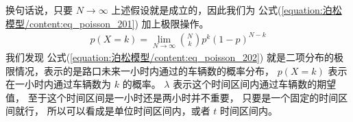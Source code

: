 \documentclass[letterpaper,10pt,english]{sphinxmanual}
\begin{document}
换句话说，只要 \(N \to \infty\)
上述假设就是成立的，因此我们为 公式(\ref{equation:泊松模型/content:eq_poisson_201})
加上极限操作。
\begin{equation}\label{equation:泊松模型/content:eq_poisson_202}
\begin{split}p(X=k) = \lim_{N \to \infty} \binom{N}{k} p^k \left ( 1-p  \right )^{N-k}\end{split}
\end{equation}
我们发现 公式(\ref{equation:泊松模型/content:eq_poisson_202}) 就是二项分布的极限情况，表示的是路口未来一小时内通过的车辆数的概率分布，
\(p(X=k)\) 表示在一小时内通过车辆数为 \(k\)
的概率。
\(\lambda\) 表示这个时间区间内通过车辆数的期望值，
至于这个时间区间是一小时还是两小时并不重要，
只要是一个固定的时间区间就行，
所以可以看成是单位时间区间内，或者 \(t\) 时间区间内。
\end{document}
